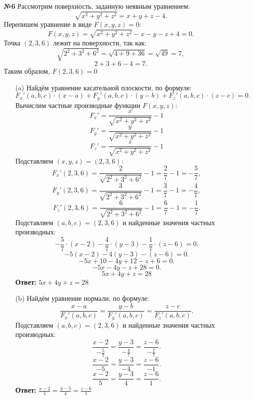 \documentclass[a4paper]{article}
\begin{document}
\begin{enumerate}
    \item[\textbf{№6}]Рассмотрим поверхность, заданную неявным уравнением:
    \[
    \sqrt{x^2 + y^2 + z^2} = x + y + z - 4.
    \]
    Перепишем уравнение в виде \( F(x, y, z) = 0 \):
    \[
    F(x, y, z) = \sqrt{x^2 + y^2 + z^2} - x - y - z + 4 = 0.
    \]
    Точка \( (2, 3, 6) \) лежит на поверхности, так как:
    \[
    \sqrt{2^2 + 3^2 + 6^2} = \sqrt{4 + 9 + 36} = \sqrt{49} = 7,
    \]
    \[
    2 + 3 + 6 - 4 = 7.
    \]
    Таким образом, \( F(2, 3, 6) = 0 \)
    \begin{enumerate}
        \item[(a)]Найдём уравнение касательной плоскости, по формуле:
        \[
        F_x'(a, b, c) \cdot (x - a) + F_y'(a, b, c) \cdot (y - b) + F_z'(a, b, c) \cdot (z - c) = 0.
        \]
        Вычислим частные производные функции
         \( F(x, y, z)\):
        \[
        F_x' = \frac{x}{\sqrt{x^2 + y^2 + z^2}} - 1
        \]
        \[
        F_y' = \frac{y}{\sqrt{x^2 + y^2 + z^2}} - 1
        \]
        \[
        F_z' = \frac{z}{\sqrt{x^2 + y^2 + z^2}} - 1
        \]
        Подставляем \( (x, y, z) = (2, 3, 6) \):
        \[
        F_x'(2, 3, 6) = \frac{2}{\sqrt{2^2 + 3^2 + 6^2}} - 1 = \frac{2}{7} - 1 = -\frac{5}{7},
        \]
        \[
        F_y'(2, 3, 6) = \frac{3}{\sqrt{2^2 + 3^2 + 6^2}} - 1 = \frac{3}{7} - 1 = -\frac{4}{7},
        \]
        \[
        F_z'(2, 3, 6) = \frac{6}{\sqrt{2^2 + 3^2 + 6^2}} - 1 = \frac{6}{7} - 1 = -\frac{1}{7}.
        \]
        Подставляем \( (a, b, c) = (2, 3, 6) \) и найденные значения частных производных:
        \[
        -\frac{5}{7} \cdot (x - 2) - \frac{4}{7} \cdot (y - 3) - \frac{1}{7} \cdot (z - 6) = 0.
        \]
        \[
        -5(x - 2) - 4(y - 3) - (z - 6) = 0.
        \]
        \[
        -5x + 10 - 4y + 12 - z + 6 = 0.
        \]
        \[
        -5x - 4y - z + 28 = 0.
        \]
        \[
        5x + 4y + z = 28
        \]
        \textbf{Ответ: } $5x + 4y + z = 28$

        \item[(b)]
        Найдём уравнение нормали, по формуле:
        \[
        \frac{x - a}{F_x'(a, b, c)} = \frac{y - b}{F_y'(a, b, c)} = \frac{z - c}{F_z'(a, b, c)}.
        \]
        Подставляем \( (a, b, c) = (2, 3, 6) \) и найденные значения частных производных:
        \[
        \frac{x - 2}{-\frac{5}{7}} = \frac{y - 3}{-\frac{4}{7}} = \frac{z - 6}{-\frac{1}{7}}.
        \]
        \[
        \frac{x - 2}{-5} = \frac{y - 3}{-4} = \frac{z - 6}{-1}.
        \]
        \[
        \frac{x - 2}{5} = \frac{y - 3}{4} = \frac{z - 6}{1}.
        \]
        \textbf{Ответ: }$\frac{x - 2}{5} = \frac{y - 3}{4} = \frac{z - 6}{1}$

    \end{enumerate}

\end{enumerate}
\end{document}
